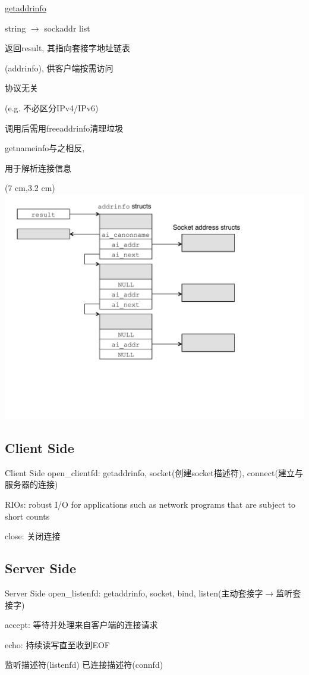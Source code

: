 \documentclass[]{beamer}
\begin{document}
\begin{frame}{\href{https://www.man7.org/linux/man-pages/man3/getaddrinfo.3.html}{getaddrinfo}}

	string $\to$ sockaddr list
	
	返回result, 其指向套接字地址链表
	
	(addrinfo), 供客户端按需访问
	
	协议无关
	
	(e.g. 不必区分IPv4/IPv6)
	
	调用后需用freeaddrinfo清理垃圾
	
	getnameinfo与之相反, 
	
	用于解析连接信息
	\begin{textblock*}{10.3cm}(7 cm,3.2 cm)
	\includegraphics[width=0.58\linewidth]{figures/addrinfolist}
	\end{textblock*}
\end{frame}

\subsection{Client Side}
\begin{frame}{Client Side}
	open\_clientfd: getaddrinfo, socket(创建socket描述符), connect(建立与服务器的连接)
	
	RIOs: robust I/O for applications such as network programs that are subject to short counts
	
	close: 关闭连接
\end{frame}

\subsection{Server Side}
\begin{frame}{Server Side}
	open\_listenfd: getaddrinfo, socket, bind, listen(主动套接字$\to$监听套接字)
	
	accept: 等待并处理来自客户端的连接请求
	
	echo: 持续读写直至收到EOF
	
	监听描述符(listenfd) 已连接描述符(connfd)
\end{frame}
\end{document}
